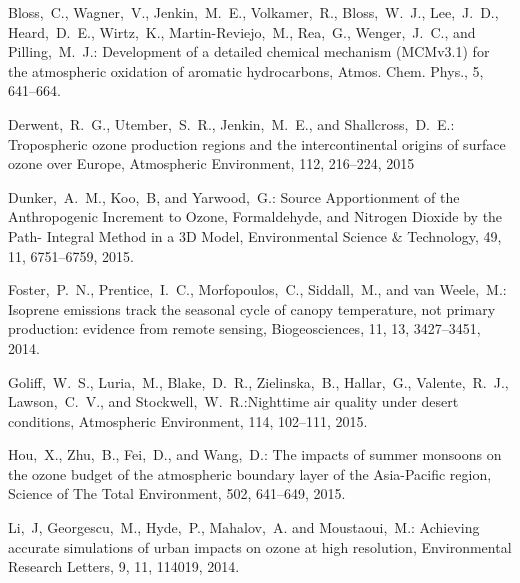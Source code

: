 \documentclass{article}
\begin{document}
\begin{thebibliography}{12}
     Bloss,~C., Wagner,~V., Jenkin,~M.~E., Volkamer,~R., Bloss,~W.~J., Lee,~J.~D., Heard,~D.~E., Wirtz,~K., Martin-Reviejo,~M., Rea,~G., Wenger,~J.~C., and Pilling,~M.~J.: Development of a detailed chemical mechanism (MCMv3.1) for the atmospheric oxidation of aromatic hydrocarbons, Atmos. Chem. Phys., 5, 641--664. %

     Derwent,~R.~G., Utember,~S.~R., Jenkin,~M.~E., and Shallcross,~D.~E.: Tropospheric ozone production regions and the intercontinental origins of surface ozone over Europe, Atmospheric Environment, 112, 216--224, 2015

     Dunker,~A.~M., Koo,~B, and Yarwood,~G.: Source Apportionment of the Anthropogenic Increment to Ozone, Formaldehyde, and Nitrogen Dioxide by the Path- Integral Method in a 3D Model, Environmental Science \& Technology, 49, 11, 6751--6759, 2015.

    Foster,~P.~N., Prentice,~I.~C., Morfopoulos,~C., Siddall,~M., and van Weele,~M.: Isoprene emissions track the seasonal cycle of canopy temperature, not primary production: evidence from remote sensing, Biogeosciences, 11, 13, 3427--3451, 2014.

     Goliff,~W.~S., Luria,~M., Blake,~D.~R., Zielinska,~B., Hallar,~G., Valente,~R.~J., Lawson,~C.~V., and Stockwell,~W.~R.:Nighttime air quality under desert conditions, Atmospheric Environment, 114, 102--111, 2015.

     Hou,~X., Zhu,~B., Fei,~D., and Wang,~D.: The impacts of summer monsoons on the ozone budget of the atmospheric boundary layer of the Asia-Pacific region, Science of The Total Environment, 502, 641--649, 2015.

    Li,~J, Georgescu,~M., Hyde,~P., Mahalov,~A. and Moustaoui,~M.: Achieving accurate simulations of urban impacts on ozone at high resolution, Environmental Research Letters, 9, 11, 114019, 2014.


\end{thebibliography}
\end{document}
